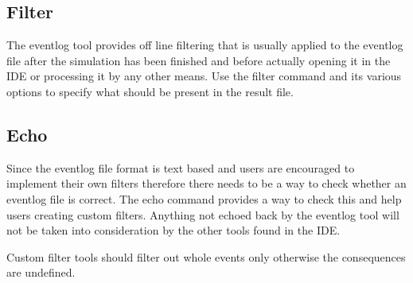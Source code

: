 \subsection{Filter}

The eventlog tool provides off line filtering that is usually applied to the eventlog file
after the simulation has been finished and before actually opening it in the {\opp} IDE
or processing it by any other means. Use the filter command and its various options to
specify what should be present in the result file.

\subsection{Echo}

Since the eventlog file format is text based and users are encouraged to implement their
own filters therefore there needs to be a way to check whether an eventlog file is
correct. The echo command provides a way to check this and help users creating custom
filters. Anything not echoed back by the eventlog tool will not be taken into
consideration by the other tools found in the {\opp} IDE.

\begin{note}
    Custom filter tools should filter out whole events only otherwise the
    consequences are undefined.
\end{note}

